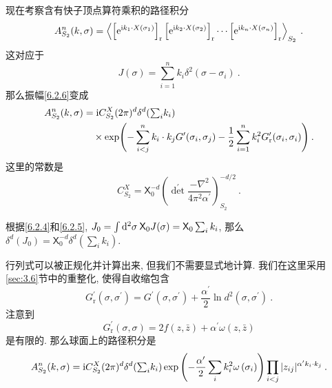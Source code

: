 现在考察含有快子顶点算符乘积的路径积分
\begin{equation}
	A_{S_{2}}^{n}(k, \sigma)=\left\langle\left[\mathrm{e}^{\mathrm{i} k_{1} \cdot X(\sigma_{1})}\right]_{\mathrm{r}}
	\left[\mathrm{e}^{\mathrm{i} k_{2} \cdot X(\sigma_{2})}\right]_{\mathrm{r}} \cdots
	\left[\mathrm{e}^{\mathrm{i} k_{n} \cdot X(\sigma_{n})}\right]_{\mathrm{r}}\right\rangle_{S_{2}} \:. \label{6.2.11}
\end{equation}
这对应于
\begin{equation}
	J(\sigma)=\sum_{i=1}^{n} k_{i} \delta^{2}(\sigma-\sigma_{i}) \:. \label{6.2.12}
\end{equation}
那么振幅\eqref{6.2.6}变成
	\begin{align}
		A_{S_{2}}^{n}(k, \sigma) &=\mathrm{i} C_{S_{2}}^{X}(2 \pi)^{d} \delta^{d}({\textstyle \sum_{i}} k_{i}) \nonumber \\
		& \quad \times \exp \Biggl(-\sum_{ i<j}^{n} k_{i} \cdot k_{j} G^{\prime}(\sigma_{i}, \sigma_{j})
		-\frac{1}{2} \sum_{i=1}^{n} k_{i}^{2} G_{\mathrm{r}}^{\prime}(\sigma_{i}, \sigma_{i})\Biggr) \:. \label{6.2.13}
	\end{align}
这里的常数是
\begin{equation}
	C_{S_{2}}^{X}=\mathsf{X}_{0}^{-d}\left(\operatorname{det}^{\prime} \frac{-\nabla^{2}}{4 \pi^{2} \alpha^{\prime}}\right)_{S_{2}}^{-d/2} 
	\:. \label{6.2.14}
\end{equation}
\begin{tcolorbox}
	\begin{remark}
		根据\eqref{6.2.4}和\eqref{6.2.5}, $J_{0}=\int \mathrm{d}^{2} \sigma \: \mathsf{X}_{0} J(\sigma)= \mathsf{X}_{0} \sum_{i} k_{i} $, 
		那么$\delta^{d}(J_{0})=\mathsf{X}_{0}^{-d} \delta^{d}(\sum_{i} k_{i})$.
	\end{remark}
\end{tcolorbox}
\noindent 行列式可以被正规化并计算出来, 但我们不需要显式地计算. 我们在这里采用\ref{sec:3.6}节中的重整化, 使得自收缩包含
\begin{equation}
	G_{\mathrm{r}}^{\prime}(\sigma, \sigma^{\prime})=G^{\prime}(\sigma, \sigma^{\prime})
	+\frac{\alpha^{\prime}}{2} \ln d^{2}(\sigma, \sigma^{\prime}) \:. \label{6.2.15}
\end{equation}
注意到
\begin{equation}
	G_{\mathrm{r}}^{\prime}(\sigma, \sigma)=2 f(z, \bar{z})+\alpha^{\prime} \omega(z, \bar{z}) \label{6.2.16}
\end{equation}
是有限的. 
那么球面上的路径积分是
\begin{equation}
	A_{S_{2}}^{n}(k, \sigma)=\mathrm{i} C_{S_{2}}^{X}(2 \pi)^{d} \delta^{d}({\textstyle \sum_{i}} k_{i}) 
	\exp \left(-\frac{\alpha^{\prime}}{2} \sum_{i} k_{i}^{2} \omega\left(\sigma_{i}\right)\right) 
	\prod_{i<j}|z_{i j}|^{\alpha^{\prime} k_{i} \cdot k_{j}} \:. \label{6.2.17}
\end{equation}
